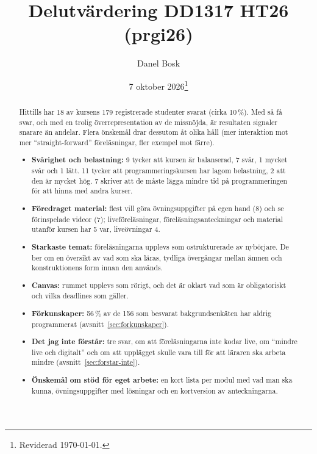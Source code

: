 \documentclass[a4paper]{article}
\title{Delutvärdering DD1317 HT26 (prgi26)}
\author{Danel Bosk}
\date{7 oktober 2026\footnote{Reviderad \today.}}
\begin{document}
\maketitle

\begin{abstract}
Hittills har 18 av kursens 179 registrerade studenter svarat (cirka
10\,\%). Med så få svar, och med en trolig överrepresentation av de
missnöjda, är resultaten signaler snarare än andelar. Flera önskemål drar
dessutom åt olika håll (mer interaktion mot mer
\enquote{straight-forward} föreläsningar, fler exempel mot färre).

\begin{itemize}
\item \textbf{Svårighet och belastning:} 9 tycker att kursen är balanserad,
  7 svår, 1 mycket svår och 1 lätt. 11 tycker att programmeringskursen har
  lagom belastning, 2 att den är mycket hög. 7 skriver att de måste lägga
  mindre tid på programmeringen för att hinna med andra kurser.
\item \textbf{Föredraget material:} flest vill göra övningsuppgifter på
  egen hand (8) och se förinspelade videor (7); liveföreläsningar,
  föreläsningsanteckningar och material utanför kursen har 5 var,
  liveövningar 4.
\item \textbf{Starkaste temat:} föreläsningarna upplevs som ostrukturerade
  av nybörjare. De ber om en översikt av vad som ska läras, tydliga
  övergångar mellan ämnen och konstruktionens form innan den används.
\item \textbf{Canvas:} rummet upplevs som rörigt, och det är oklart vad som
  är obligatoriskt och vilka deadlines som gäller.
\item \textbf{Förkunskaper:} 56\,\% av de 156 som besvarat
  bakgrundsenkäten har aldrig programmerat
  (avsnitt~\ref{sec:forkunskaper}).
\item \textbf{Det jag inte förstår:} tre svar, om att föreläsningarna
  inte kodar live, om \enquote{mindre live och digitalt} och om att
  upplägget skulle vara till för att läraren ska arbeta mindre
  (avsnitt~\ref{sec:forstar-inte}).
\item \textbf{Önskemål om stöd för eget arbete:} en kort lista per modul
  med vad man ska kunna, övningsuppgifter med lösningar och en kortversion
  av anteckningarna.
\end{itemize}
\end{abstract}

\clearpage
\tableofcontents
\clearpage
\end{document}
